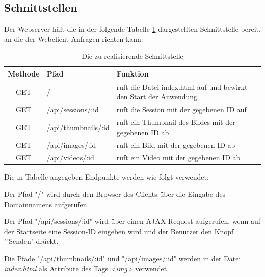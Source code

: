 \subsection{Schnittstellen}
\label{webserver_schnittstellen}
Der Webserver hält die in der folgende Tabelle \ref{tab_api_routes} dargestellten Schnittstelle bereit, an die der Webclient 
Anfragen richten kann:
\begin{table}[h]
	\begin{center}
		\begin{tabularx}{\textwidth}{|c|l|X|}
			\hline
			\textbf{Methode} & \textbf{Pfad} & \textbf{Funktion}\\
			\hline
			GET & / & ruft die Datei index.html auf und bewirkt den Start der Anwendung \\
			\hline
			GET & /api/sessions/:id & ruft die Session mit der gegebenen ID auf \\
			\hline
			GET & /api/thumbnails/:id & ruft ein Thumbnail des Bildes mit der gegebenen ID ab \\
			\hline
			GET & /api/images/:id & ruft ein Bild mit der gegebenen ID ab \\
			\hline
			GET & /api/videos/:id & ruft ein Video mit der gegebenen ID ab \\
			\hline
		\end{tabularx}
		\caption{Die zu realisierende Schnittstelle}
		\label{tab_api_routes}
	\end{center}
\end{table}

Die in Tabelle angegeben Endpunkte werden wie folgt verwendet:

Der Pfad "/"{} wird durch den Browser des Clients über die Eingabe des Domainnamens aufgerufen.

Der Pfad "/api/sessions/:id"{} wird über einen AJAX-Request aufgerufen, wenn auf der Startseite eine Session-ID 
eingeben wird und der Benutzer den Knopf  "'Senden" drückt.

Die Pfade "/api/thumbnails/:id"{} und "/api/images/:id"{} werden in der Datei \textit{index.html} als Attribute des Tags \textit{\textless img\textgreater} verwendet.


